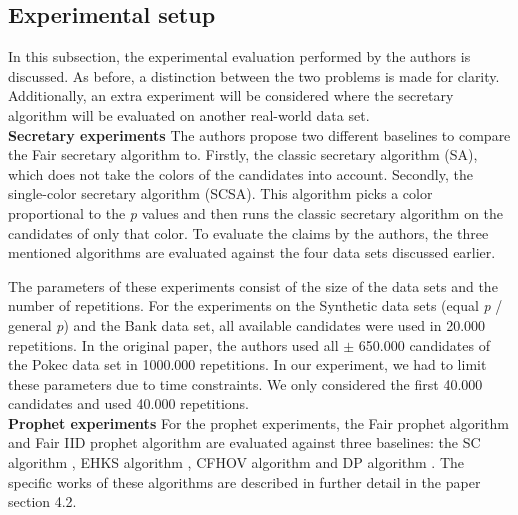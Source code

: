 \subsection{Experimental setup}
\label{experimental_setup}
In this subsection, the experimental evaluation performed by the authors is discussed. As before, a distinction between the two problems is made for clarity. Additionally, an extra experiment will be considered where the secretary algorithm will be evaluated on another real-world data set. \\
\newpage
\textbf{Secretary experiments}
\FloatBarrier
\label{Secretary_Experiments}
The authors propose two different baselines to compare the Fair secretary algorithm to. Firstly, the classic secretary algorithm (SA), which does not take the colors of the candidates into account. Secondly, the single-color secretary algorithm (SCSA). This algorithm picks a color proportional to the \textit{p} values and then runs the classic secretary algorithm on the candidates of only that color. To evaluate the claims by the authors, the three mentioned algorithms are evaluated against the four data sets discussed earlier.

The parameters of these experiments consist of the size of the data sets and the number of repetitions. For the experiments on the Synthetic data sets (equal \textit{p} / general \textit{p}) and the Bank data set, all available candidates were used in 20.000 repetitions. In the original paper, the authors used all $\pm$ 650.000 candidates of the Pokec data set in 1000.000 repetitions. In our experiment, we had to limit these parameters due to time constraints. We only considered the first 40.000 candidates and used 40.000 repetitions.\\

\textbf{Prophet experiments}
\FloatBarrier
\label{Prophet_Experiments}
For the prophet experiments, the Fair prophet algorithm and Fair IID prophet algorithm are evaluated against three baselines: the SC algorithm \citep{samuel1984comparison}, EHKS algorithm \citep{marx2021proceedings}, CFHOV algorithm \citep{correa2021posted} and DP algorithm \citep{brown1972great}. The specific works of these algorithms are described in further detail in the paper \citep{correa2021fairness} section 4.2.

